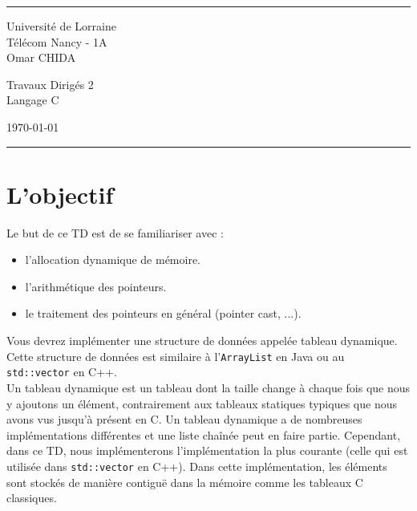 \documentclass[a4paper]{article}
\begin{document}
	
	
	\fancyhead[C]{}
	\hrule \medskip %
	\begin{minipage}{0.295\textwidth} 
		\raggedright
		\footnotesize
		Université de Lorraine\hfill\\   
		Télécom Nancy - 1A\hfill\\
		Omar CHIDA
	\end{minipage}
	\begin{minipage}{0.4\textwidth} 
		\centering 
		\large 
		Travaux Dirigés 2\\ 
		\normalsize 
		Langage C\\ 
	\end{minipage}
	\begin{minipage}{0.295\textwidth} 
		\raggedleft
		\today\hfill\\
	\end{minipage}
	\medskip\hrule 
	\bigskip
	
	
	\section*{L'objectif}
	Le but de ce TD est de se familiariser avec :
	\begin{itemize}
		\item l'allocation dynamique de mémoire.
		\item l'arithmétique des pointeurs.
		\item le traitement des pointeurs en général (pointer cast, ...).
	\end{itemize}

	Vous devrez implémenter une structure de données appelée tableau dynamique. Cette structure de données est similaire à l'\texttt{ArrayList} en Java ou au \texttt{std::vector} en C++. \\
	Un tableau dynamique est un tableau dont la taille change à chaque fois que nous y ajoutons un élément, contrairement aux tableaux statiques typiques que nous avons vus jusqu'à présent en C. Un tableau dynamique a de nombreuses implémentations différentes et une liste chaînée peut en faire partie. Cependant, dans ce TD, nous implémenterons l'implémentation la plus courante (celle qui est utilisée dans \texttt{std::vector} en C++). Dans cette implémentation, les éléments sont stockés de manière contiguë dans la mémoire comme les tableaux C classiques.
	
\end{document}
